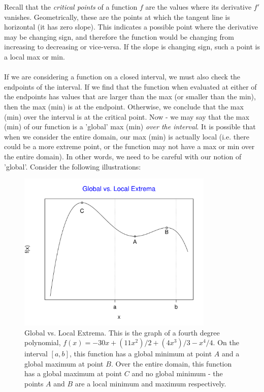 \documentclass[12pt,a4paper]{article} %
\begin{document}
Recall that the \emph{critical points} of a function $f$ are the values where its derivative $f'$ vanishes.  Geometrically, these are the points at which the tangent line is horizontal (it has zero slope).  This indicates a possible point where the derivative may be changing sign, and therefore the function would be changing from increasing to decreasing or vice-versa.  If the slope is changing sign, such a point is a local max or min.  \\\\

If we are considering a function on a closed interval, we must also check the endpoints of the interval.  If we find that the function when evaluated at either of the endpoints has values that are larger than the max (or smaller than the min), then the max (min) is at the endpoint.  Otherwise, we conclude that the max (min) over the interval is at the critical point.  Now - we may say that the max (min) of our function is a 'global' max (min) \emph{over the interval}.  It is possible that when we consider the entire domain, our max (min) is actually local (i.e. there could be a more extreme point, or the function may not have a max or min over the entire domain).  In other words, we need to be careful with our notion of 'global'. Consider the following illustrations:
\begin{figure}[H]
\includegraphics[height=3in]{extrema1.pdf}
\caption{Global vs. Local Extrema.  This is the graph of a fourth degree polynomial, $f(x)= -30x + (11x^2)/2 + (4x^3)/3 - x^4/4$.   On the interval $[a,b]$, this function has a global minimum at point $A$ and a global maximum at point $B$.  Over the entire domain, this function has a global maximum at point $C$ and no global minimum - the points $A$ and $B$ are a local minimum and maximum respectively.}
\end{figure}
\end{document}
